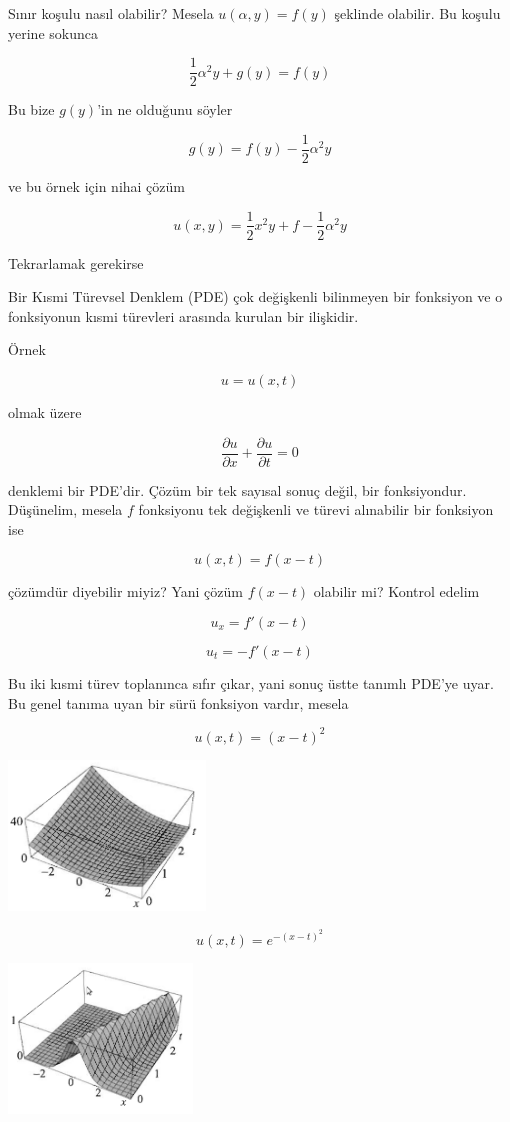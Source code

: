 \documentclass[12pt,fleqn]{article}\usepackage{../../common}
\begin{document}
Sınır koşulu nasıl olabilir? Mesela $u(\alpha,y) = f(y)$ şeklinde
olabilir. Bu koşulu yerine sokunca

$$ \frac{1}{2}\alpha^2 y + g(y) = f(y) $$

Bu bize $g(y)$'in ne olduğunu söyler

$$ g(y)  = f(y) - \frac{1}{2}\alpha^2 y $$

ve bu örnek için nihai çözüm

$$ u(x,y) = \frac{1}{2}x^2y + f - \frac{1}{2}\alpha^2 y $$

Tekrarlamak gerekirse

Bir Kısmi Türevsel Denklem (PDE) çok değişkenli bilinmeyen bir fonksiyon ve
o fonksiyonun kısmi türevleri arasında kurulan bir ilişkidir. 

Örnek 

$$ u = u(x,t) $$

olmak üzere

$$ \frac{\partial u}{\partial x} + \frac{\partial u}{\partial t} = 0$$

denklemi bir PDE'dir. Çözüm bir tek sayısal sonuç değil, bir
fonksiyondur. Düşünelim, mesela $f$ fonksiyonu tek değişkenli ve türevi
alınabilir bir fonksiyon ise

$$ u(x,t) = f(x-t) $$

çözümdür diyebilir miyiz? Yani çözüm $f(x-t)$ olabilir mi? Kontrol edelim 

$$ u_x = f'(x-t) $$

$$ u_t = -f'(x-t) $$

Bu iki kısmi türev toplanınca sıfır çıkar, yani sonuç üstte tanımlı PDE'ye
uyar. Bu genel tanıma uyan bir sürü fonksiyon vardır, mesela 

$$ u(x,t) = (x-t)^2 $$

\includegraphics[height=4cm]{1_1.png}

$$ u(x,t) = e^{-(x-t)^2} $$

\includegraphics[height=4cm]{1_2.png}
\end{document}
